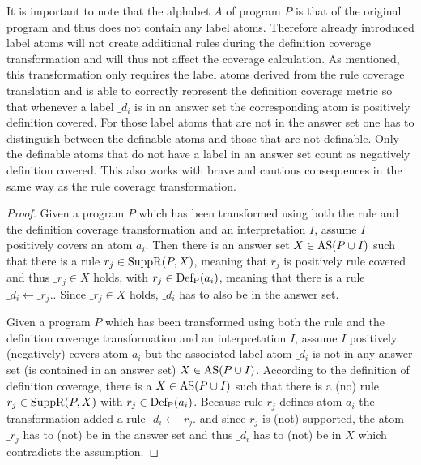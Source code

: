 It is important to note that the alphabet $A$ of program $P$ is that of the original program and thus does not contain any label atoms. Therefore already introduced label atoms will not create additional rules during the definition coverage transformation and will thus not affect the coverage calculation.
As mentioned, this transformation only requires the label atoms derived from the rule coverage translation and is able to correctly represent the definition coverage metric so that whenever a label $\_d_i$ is in an answer set the corresponding atom is positively definition covered. For those label atoms that are not in the answer set one has to distinguish between the definable atoms and those that are not definable. Only the definable atoms that do not have a label in an answer set count as negatively definition covered. This also works with brave and cautious consequences in the same way as the rule coverage transformation.

\begin{proof}
    Given a program $P$ which has been transformed using both the rule and the definition coverage transformation and an interpretation $I$, assume $I$ positively covers an atom $a_i$. Then there is an answer set \(X \in \operatorname{AS}(P \cup I)\) such that there is a rule \(r_j \in \operatorname{SuppR}(P, X)\), meaning that $r_j$ is positively rule covered and thus $\_r_j \in X$ holds, with \(r_j \in \operatorname{Def_P}(a_i)\), meaning that there is a rule \(\_d_i \leftarrow \_r_j.\). Since \(\_r_j \in X\) holds, $\_d_i$ has to also be in the answer set.

    Given a program $P$ which has been transformed using both the rule and the definition coverage transformation and an interpretation $I$, assume $I$ positively (negatively) covers atom $a_i$ but the associated label atom $\_d_i$ is not in any answer set (is contained in an answer set) \(X \in \operatorname{AS}(P \cup I)\). According to the definition of definition coverage, there is a \(X \in \operatorname{AS}(P \cup I)\) such that there is a (no) rule \(r_j \in \operatorname{SuppR}(P, X)\) with \(r_j \in \operatorname{Def_P}(a_i)\). Because rule $r_j$ defines atom $a_i$ the transformation added a rule \(\_d_i \leftarrow \_r_j.\) and since $r_j$ is (not) supported, the atom $\_r_j$ has to (not) be in the answer set and thus $\_d_i$ has to (not) be in $X$ which contradicts the assumption.
    
\end{proof}

